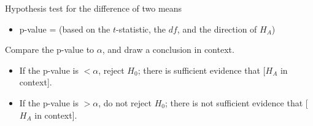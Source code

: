 \begin{onebox}{Hypothesis test for the difference of two means}
\begin{itemize}
\begin{itemize}
\item[] $SE$ of estimate:  $\sqrt{\frac{s^2_1}{n_1}+\frac{s^2_2}{n_2}}$
\end{itemize}
\item[] p-value = (based on the $t$-statistic, the $df$, and the direction of $H_A$)
\end{itemize}
  Compare the p-value to $\alpha$, and draw a conclusion in context.\vspace{-1mm}
\begin{itemize}
\item[] If the p-value is $< \alpha$, reject $H_0$; there is sufficient evidence that [$H_A$ in context]. 
\item[] If the p-value is $> \alpha$, do not reject $H_0$; there is not sufficient evidence that [$H_A$ in context].
\end{itemize}\end{onebox}




\D{\newpage}

